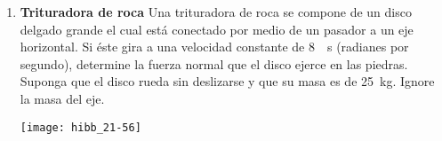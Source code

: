 \documentclass[11pt, spanish, a4paper, twoside]{article}
\begin{document}
\begin{enumerate}
	\item 
	\begin{minipage}[t][3.5cm]{0.65\textwidth}
		\textbf{Trituradora de roca}
		Una trituradora de roca se compone de un disco delgado grande el cual está conectado por medio de un pasador a un eje horizontal.
		Si éste gira a una velocidad constante de \SI{8}{\per\second} (radianes por segundo), determine la fuerza normal que el disco ejerce en las piedras.
		Suponga que el disco rueda sin deslizarse y que su masa es de \SI{25}{\kilo\gram}.
		Ignore la masa del eje.
	\end{minipage}
	\begin{minipage}[c][2cm][t]{0.3\textwidth}
		\texttt{[image: hibb\_21-56]}
	\end{minipage}


\end{enumerate}
\end{document}
